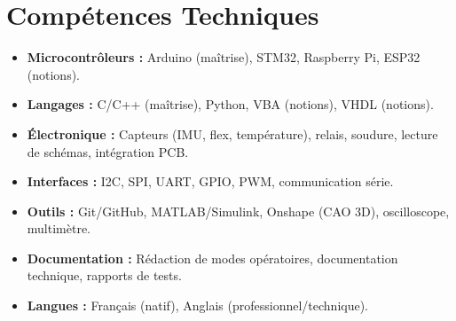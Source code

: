 \documentclass[a4paper,11pt]{article}
\begin{document}
\section{Compétences Techniques}
\begin{itemize}[leftmargin=*, nosep]
    \item \small{\textbf{Microcontrôleurs :} Arduino (maîtrise), STM32, Raspberry Pi, ESP32 (notions).}
    \item \small{\textbf{Langages :} C/C++ (maîtrise), Python, VBA (notions), VHDL (notions).}
    \item \small{\textbf{Électronique :} Capteurs (IMU, flex, température), relais, soudure, lecture de schémas, intégration PCB.}
    \item \small{\textbf{Interfaces :} I2C, SPI, UART, GPIO, PWM, communication série.}
    \item \small{\textbf{Outils :} Git/GitHub, MATLAB/Simulink, Onshape (CAO 3D), oscilloscope, multimètre.}
    \item \small{\textbf{Documentation :} Rédaction de modes opératoires, documentation technique, rapports de tests.}
    \item \small{\textbf{Langues :} Français (natif), Anglais (professionnel/technique).}
\end{itemize}

\end{document}
